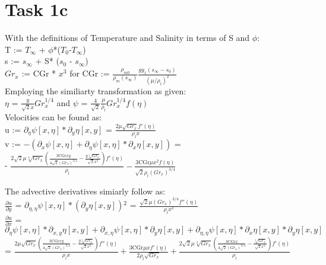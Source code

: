 \documentclass[letterpaper, 10pt]{article}
\begin{document}
\section*{Task 1c} %
\label{sec:Task 1b}
With the definitions of Temperature and Salinity in terms of S and $\phi$:\\
T := $T_\infty$ + $\phi$*($T_0$-$T_\infty$)\\
s := $s_\infty $ + S* ($s_0$ - $s_\infty $)\\
$Gr_x$ := CGr * $x^3$ for CGr := $\frac{\rho_{m0}}{\rho_m (s_\infty)}\frac{g g_1 (s_\infty-s_0)}{(\mu/\rho_l)^2}$\\

\noindent Employing the similiarty transformation as given:\\ 
$\eta$ = $\frac{y}{\sqrt{2}x} Gr_x^{1/4}$ and $\psi$ = $\frac{4}{\sqrt{2}}\frac{\mu}{\rho_l} Gr_x^{1/4} f(\eta)$\\

\noindent Velocities can be found as:\\
u := $\partial_\eta \psi [x,\eta ]*\partial _y\eta [x,y]$ = $\frac{2 \mu  \sqrt{Gr_x} f'(\eta )}{\rho_l x}$\\
v := $-\left(\partial _x\psi [x,\eta ]+\partial _{\eta }\psi [x,\eta ]*\partial _x\eta [x,y]\right) $ = \\ - $\frac{2 \sqrt{2} \mu  \sqrt[4]{Gr_x} \left(\frac{3 \text{CGr} x y}{4 \sqrt{2} \left(Gr_x\right)^{3/4}}-\frac{y \sqrt[4]{Gr_x}}{\sqrt{2} x^2}\right) f'(\eta )}{\rho_l}-\frac{3 \text{CGr} \mu  x^2 f(\eta )}{\sqrt{2} \rho_l \left(Gr_x\right)^{3/4}}$

\noindent The advective derivatives simiarly follow as:\\ 
$\frac{\partial u}{\partial y}$ = $\partial _{\eta ,\eta }\psi [x,\eta ]*\left(\partial _y\eta [x,y]\right){}^2$ = $\frac{\sqrt{2} \mu  \left(Gr_x\right)^{3/4} f''(\eta )}{\rho_l x^2}$\\
$\frac{\partial u}{\partial x}$ = $\partial _{\eta }\psi [x,\eta ]*\partial _{x,y}\eta [x,y]+\partial _{x,\eta }\psi [x,\eta ]*\partial _y\eta [x,y]+\partial
_{\eta ,\eta }\psi [x,\eta ]*\partial _x\eta [x,y]*\partial _y\eta [x,y]$ =  $\frac{2 \mu  \sqrt{Gr_x} \left(\frac{3 \text{CGr} x y}{4 \sqrt{2} \left(Gr_x\right)^{3/4}}-\frac{y \sqrt[4]{Gr_x}}{\sqrt{2} x^2}\right) f''(\eta )}{\rho_l x}+\frac{3 \text{CGr} \mu  x f'(\eta )}{2 \rho_l \sqrt{Gr_x}}+\frac{2 \sqrt{2}\mu  \sqrt[4]{Gr_x} \left(\frac{3 \text{CGr} x}{4 \sqrt{2} \left(Gr_x\right)^{3/4}}-\frac{\sqrt[4]{Gr_x}}{\sqrt{2} x^2}\right) f'(\eta )}{\rho_l}$ \\
\end{document}
